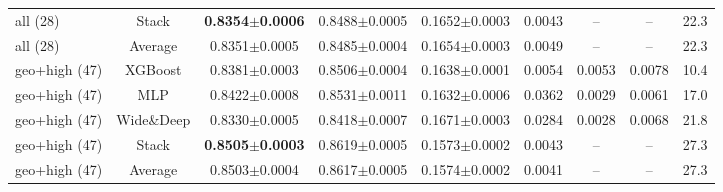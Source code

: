 \begin{table}[!t]
\begin{tabular}{lcccccccc}
all (28) & Stack & \textbf{0.8354$\pm$0.0006} & 0.8488$\pm$0.0005 & 0.1652$\pm$0.0003 & 0.0043 & -- & -- & 22.3 \\
all (28) & Average & 0.8351$\pm$0.0005 & 0.8485$\pm$0.0004 & 0.1654$\pm$0.0003 & 0.0049 & -- & -- & 22.3 \\
geo+high (47) & XGBoost & 0.8381$\pm$0.0003 & 0.8506$\pm$0.0004 & 0.1638$\pm$0.0001 & 0.0054 & 0.0053 & 0.0078 & 10.4 \\
geo+high (47) & MLP & 0.8422$\pm$0.0008 & 0.8531$\pm$0.0011 & 0.1632$\pm$0.0006 & 0.0362 & 0.0029 & 0.0061 & 17.0 \\
geo+high (47) & Wide\&Deep & 0.8330$\pm$0.0005 & 0.8418$\pm$0.0007 & 0.1671$\pm$0.0003 & 0.0284 & 0.0028 & 0.0068 & 21.8 \\
geo+high (47) & Stack & \textbf{0.8505$\pm$0.0003} & 0.8619$\pm$0.0005 & 0.1573$\pm$0.0002 & 0.0043 & -- & -- & 27.3 \\
geo+high (47) & Average & 0.8503$\pm$0.0004 & 0.8617$\pm$0.0005 & 0.1574$\pm$0.0002 & 0.0041 & -- & -- & 27.3 \\
\bottomrule
\end{tabular}
\end{table}
